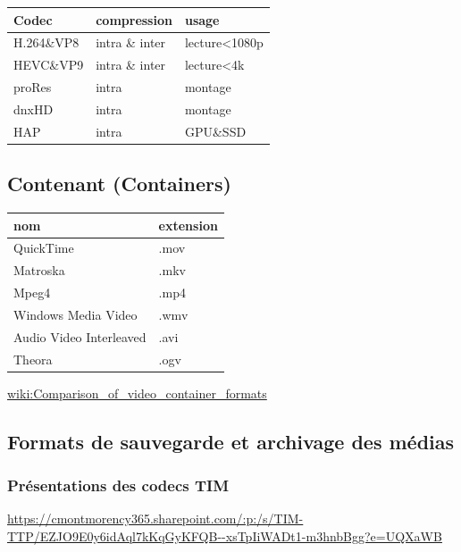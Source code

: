 \documentclass[
  french,
]{book}
\begin{document}
\begin{longtable}[]{@{}lll@{}}
\toprule
Codec & compression & usage \\
\midrule
\endhead
H.264\&VP8 & intra \& inter & lecture\textless1080p \\
HEVC\&VP9 & intra \& inter & lecture\textless4k \\
proRes & intra & montage \\
dnxHD & intra & montage \\
HAP & intra & GPU\&SSD \\
\bottomrule
\end{longtable}

\hypertarget{contenant-containers}{%
\subsection{Contenant (Containers)}\label{contenant-containers}}

\begin{longtable}[]{@{}ll@{}}
\toprule
nom & extension \\
\midrule
\endhead
QuickTime & .mov \\
Matroska & .mkv \\
Mpeg4 & .mp4 \\
Windows Media Video & .wmv \\
Audio Video Interleaved & .avi \\
Theora & .ogv \\
\bottomrule
\end{longtable}

\href{https://en.wikipedia.org/wiki/Comparison_of_video_container_formats}{wiki:Comparison\_of\_video\_container\_formats}

\hypertarget{formats-de-sauvegarde-et-archivage-des-muxe9dias}{%
\subsection{Formats de sauvegarde et archivage des médias}\label{formats-de-sauvegarde-et-archivage-des-muxe9dias}}

\hypertarget{pruxe9sentations-des-codecs-tim}{%
\subsubsection{Présentations des codecs TIM}\label{pruxe9sentations-des-codecs-tim}}

\url{https://cmontmorency365.sharepoint.com/:p:/s/TIM-TTP/EZJO9E0y6idAql7kKqGyKFQB--xsTpIiWADt1-m3hnbBgg?e=UQXaWB}
\end{document}
